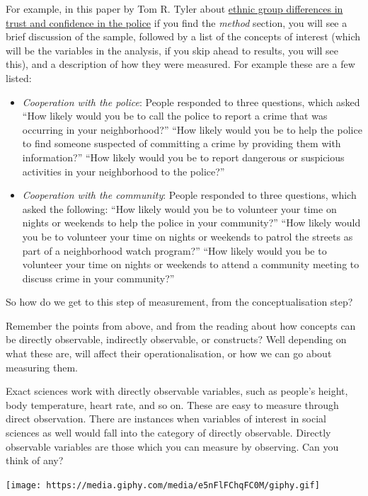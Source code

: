 \documentclass[]{book}
\providecommand{\tightlist}{%
  \setlength{\itemsep}{0pt}\setlength{\parskip}{0pt}}
\theoremstyle{definition}
\theoremstyle{definition}
\theoremstyle{definition}
\theoremstyle{remark}
\begin{document}
For example, in this paper by Tom R. Tyler about
\href{http://journals.sagepub.com/doi/abs/10.1177/1098611104271105}{ethnic
group differences in trust and confidence in the police} if you find the
\emph{method} section, you will see a brief discussion of the sample,
followed by a list of the concepts of interest (which will be the
variables in the analysis, if you skip ahead to results, you will see
this), and a description of how they were measured. For example these
are a few listed:

\begin{itemize}
\tightlist
\item
  \emph{Cooperation with the police}: People responded to three
  questions, which asked ``How likely would you be to call the police to
  report a crime that was occurring in your neighborhood?'' ``How likely
  would you be to help the police to find someone suspected of
  committing a crime by providing them with information?'' ``How likely
  would you be to report dangerous or suspicious activities in your
  neighborhood to the police?''
\item
  \emph{Cooperation with the community}: People responded to three
  questions, which asked the following: ``How likely would you be to
  volunteer your time on nights or weekends to help the police in your
  community?'' ``How likely would you be to volunteer your time on
  nights or weekends to patrol the streets as part of a neighborhood
  watch program?'' ``How likely would you be to volunteer your time on
  nights or weekends to attend a community meeting to discuss crime in
  your community?''
\end{itemize}

So how do we get to this step of measurement, from the conceptualisation
step?

Remember the points from above, and from the reading about how concepts
can be directly observable, indirectly observable, or constructs? Well
depending on what these are, will affect their operationalisation, or
how we can go about measuring them.

Exact sciences work with directly observable variables, such as people's
height, body temperature, heart rate, and so on. These are easy to
measure through direct observation. There are instances when variables
of interest in social sciences as well would fall into the category of
directly observable. Directly observable variables are those which you
can measure by observing. Can you think of any?

\texttt{[image: https://media.giphy.com/media/e5nFlFChqFC0M/giphy.gif]}
\end{document}
